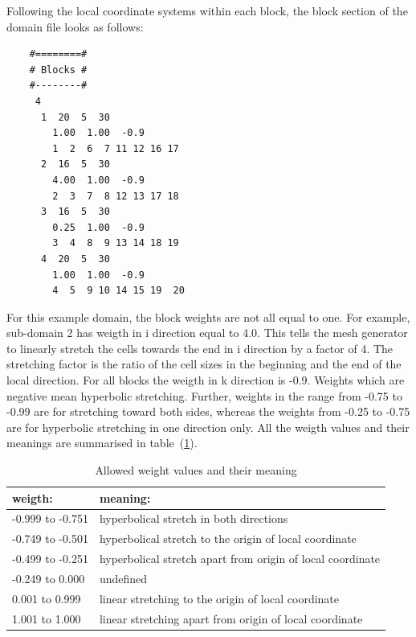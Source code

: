 \documentclass[10pt]{article}
\begin{document}
    Following the local coordinate
    systems within each block, the block section of the domain
    file looks as follows:
    \small
    \begin{verbatim}
    #========#
    # Blocks #
    #--------#
     4
      1  20  5  30
        1.00  1.00  -0.9
        1  2  6  7 11 12 16 17
      2  16  5  30
        4.00  1.00  -0.9
        2  3  7  8 12 13 17 18
      3  16  5  30
        0.25  1.00  -0.9
        3  4  8  9 13 14 18 19
      4  20  5  30
        1.00  1.00  -0.9
        4  5  9 10 14 15 19  20         
    \end{verbatim}
    \normalsize
    For this example domain, the block weights are not all equal
    to one. For example, sub-domain 2 has weigth in i direction
    equal to 4.0. This tells the mesh generator to linearly stretch
    the cells towards the end in i direction by a factor of 4.
    The stretching factor is the ratio of the cell sizes in the
    beginning and the end of the local direction.  For all blocks
    the weigth in k direction is -0.9. Weights which are negative
    mean hyperbolic stretching. Further, weights in the range from
    -0.75 to -0.99 are for stretching toward both sides, whereas the
    weights from -0.25 to -0.75 are for hyperbolic stretching in 
    one direction only. All the weigth values and their meanings
    are summarised in table~(\ref{weigths}).
    \begin{table}
    \begin{tabular}{|l|l|}  \hline
      weigth:          & meaning: \\
       \hline 
      -0.999 to -0.751 & hyperbolical stretch in both directions \\
       \hline
      -0.749 to -0.501 & hyperbolical stretch to the origin of
                         local coordinate \\
       \hline
      -0.499 to -0.251 & hyperbolical stretch apart from origin 
                         of local coordinate \\
       \hline
      -0.249 to  0.000 & undefined \\
       \hline
       0.001 to  0.999 & linear stretching to the origin of 
                         local coordinate \\ 
       \hline
       1.001 to  1.000 & linear stretching apart from origin
                         of local coordinate \\ 
       \hline
    \end{tabular}
    \caption{Allowed weight values and their meaning}
    \label{weigths}
    \end{table}
\end{document}
